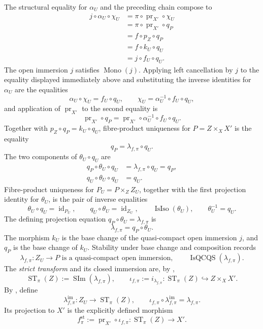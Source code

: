 \begin{definition}
\[  \]
  The structural equality for $\alpha_U$ and the preceding chain compose to
  \[
  \begin{aligned}
    j\circ\alpha_U\circ\chi_U
      &=\pi\circ\operatorname{pr}_{X'}\circ\chi_U\\
      &=\pi\circ\operatorname{pr}_{X'}\circ q_P\\
      &=f\circ p_Z\circ q_P\\
      &=f\circ k_U\circ q_U\\
      &=j\circ f_U\circ q_U.
  \end{aligned}
  \]
  The open immersion $j$ satisfies
  $\operatorname{Mono}(j)$.  Applying left cancellation by $j$ to
  the equality displayed immediately above and substituting the inverse
  identities for $\alpha_U$ are the equalities
  \[
    \alpha_U\circ\chi_U=f_U\circ q_U,
    \qquad
    \chi_U=\alpha_U^{-1}\circ f_U\circ q_U,
  \]
  and application of $\operatorname{pr}_{X'}$ to the second equality is
  \[
    \operatorname{pr}_{X'}\circ q_P
      =\operatorname{pr}_{X'}\circ\alpha_U^{-1}\circ f_U\circ q_U.
  \]
  Together with $p_Z\circ q_P=k_U\circ q_U$, fibre-product uniqueness for
  $P=Z\times_XX'$ is the equality
  \[
    q_P=\lambda_{f,\pi}\circ q_U.
  \]
  The two components of $\theta_U\circ q_U$ are
  \[
  \begin{aligned}
    q_P\circ\theta_U\circ q_U
      &=\lambda_{f,\pi}\circ q_U=q_P,\\
    q_U\circ\theta_U\circ q_U&=q_U.
  \end{aligned}
  \]
  Fibre-product uniqueness for $P_U=P\times_ZZ_U$, together with the first
  projection identity for $\theta_U$, is the pair of inverse equalities
  \[
    \theta_U\circ q_U=\operatorname{id}_{P_U},
    \qquad
    q_U\circ\theta_U=\operatorname{id}_{Z_U},
    \qquad
    \operatorname{IsIso}(\theta_U),
    \qquad
    \theta_U^{-1}=q_U.
  \]
  The defining projection equation $q_P\circ\theta_U=\lambda_{f,\pi}$ is
  \[
    \lambda_{f,\pi}=q_P\circ\theta_U.
  \]
  The morphism $k_U$ is the base change of the quasi-compact open immersion
  $j$, and $q_P$ is the base change of $k_U$.  Stability under base change
  and composition records
  \[
    \lambda_{f,\pi}\colon Z_U\to P
      \text{ is a quasi-compact open immersion},
    \qquad
    \operatorname{IsQCQS}(\lambda_{f,\pi}).
  \]
  The \emph{strict transform} and its closed immersion are, by
  ,
  \[
    \operatorname{ST}_{\pi}(Z)
      :=\operatorname{SIm}(\lambda_{f,\pi}),
    \qquad
    \iota_{f,\pi}:=i_{\lambda_{f,\pi}}\colon
      \operatorname{ST}_{\pi}(Z)\hookrightarrow Z\times_XX'.
  \]
  By , define
  \[
    \lambda_{f,\pi}^{\mathrm{im}}\colon
      Z_U\longrightarrow\operatorname{ST}_{\pi}(Z),
    \qquad
    \iota_{f,\pi}\circ\lambda_{f,\pi}^{\mathrm{im}}
      =\lambda_{f,\pi}.                                           \tag{ST0f}
  \]
  Its projection to $X'$ is the explicitly defined morphism
  \[
    f^{\mathrm{st}}_{\pi}
      :=\operatorname{pr}_{X'}\circ\iota_{f,\pi}
      \colon\operatorname{ST}_{\pi}(Z)\longrightarrow X'.
  \]


\end{definition}
